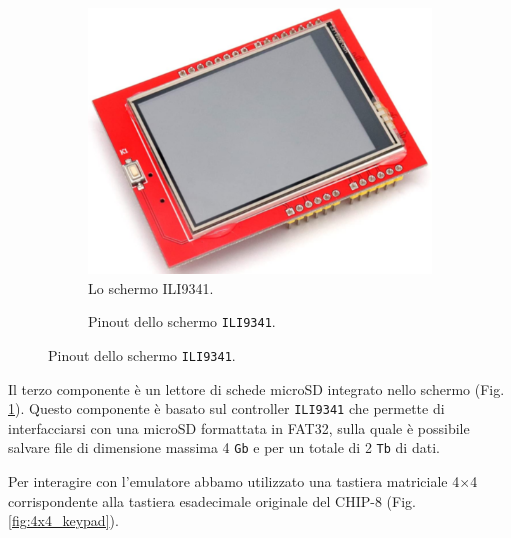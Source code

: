 \documentclass[a4paper]{article}
\begin{document}
\begin{figure}[h!t]
    \begin{subfigure}[b]{0.45\textwidth}
        \begin{center}
            \includegraphics[scale=0.30]{figures/ili9341.png}
        \end{center}
        \caption{Lo schermo ILI9341.}
        \label{fig:ili9341}
    \end{subfigure}
    \hfill
    \begin{subfigure}[b]{0.45\textwidth}
        \begin{center}
            \begin{tikzpicture}[x=0.015cm, y=0.015cm, scale=0.65, transform shape]
                
            \end{tikzpicture}
        \end{center}
        \caption{Pinout dello schermo \texttt{ILI9341}.}
        \label{fig:pinout_ili}
    \end{subfigure}
\end{figure}

Il terzo componente è un lettore di schede microSD integrato nello schermo
(Fig. \ref{fig:ili9341}). Questo componente è basato sul controller
\texttt{ILI9341} che permette di interfacciarsi con una microSD formattata in
FAT32, sulla quale è possibile salvare file di dimensione massima 4 \texttt{Gb}
e per un totale di 2 \texttt{Tb} di dati.

Per interagire con l'emulatore abbamo utilizzato una tastiera matriciale 4$\times$4
corrispondente alla tastiera esadecimale originale del CHIP-8 (Fig. \ref{fig:4x4_keypad}).
\end{document}
